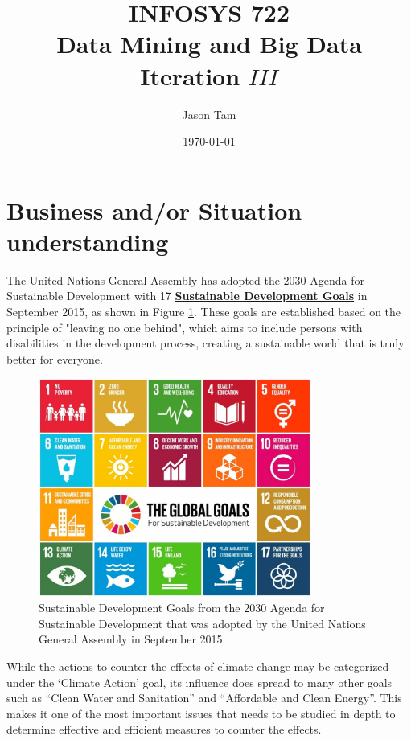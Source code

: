 \documentclass[11pt,a4paper,titlepage]{article}
\title{\blue INFOSYS 722 \\
Data Mining and Big Data \\
\blueb Iteration $III$}
\author{Jason Tam}
\date{\today}
\newcommand{\blankline}{\quad\pagebreak[2]}
\begin{document}
\maketitle

\section{Business and/or Situation understanding}

The United Nations General Assembly has adopted the 2030 Agenda for Sustainable Development with 17 \href{https://www.un.org/development/desa/disabilities/envision2030.html}{\textbf{Sustainable Development Goals}} in September 2015, as shown in Figure \ref{fig:UNGoals}. These goals are established based on the principle of "leaving no one behind", which aims to include persons with disabilities in the development process, creating a sustainable world that is truly better for everyone.

\blankline

\begin{figure}[!htbp]
    \begin{center}
        \includegraphics[width=0.8\textwidth]{UNGoals.png}
        \caption{Sustainable Development Goals from the 2030 Agenda for Sustainable Development that was adopted by the United Nations General Assembly in September 2015.}
        \label{fig:UNGoals}
    \end{center}
\end{figure}
 
While the actions to counter the effects of climate change may be categorized under the ‘Climate Action’ goal, its influence does spread to many other goals such as “Clean Water and Sanitation” and “Affordable and Clean Energy”. This makes it one of the most important issues that needs to be studied in depth to determine effective and efficient measures to counter the effects. 
\end{document}

